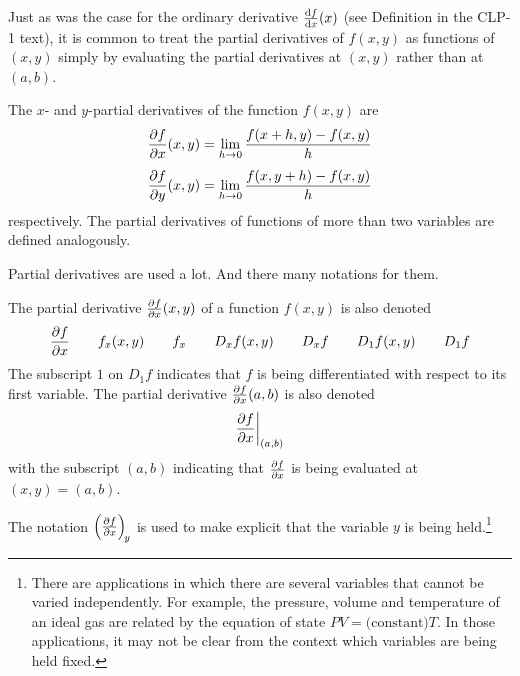 Just as was the case for the ordinary derivative $\diff{f}{x}(x)$
(see Definition  in the CLP-1 text),
it is common to treat the partial derivatives of $f(x,y)$ as functions
of $(x,y)$ simply by evaluating the partial derivatives at $(x,y)$ rather 
than at $(a,b)$.
\begin{defn}\label{def partials}
The $x$- and $y$-partial derivatives of the function $f(x,y)$
are
\begin{align*}
\pdiff{f}{x}(x,y)
  &= \lim_{h\rightarrow 0}\frac{f(x+h,y) - f(x,y)}{h} \\[0.05in]
\pdiff{f}{y}(x,y)
  &= \lim_{h\rightarrow 0}\frac{f(x,y+h) - f(x,y)}{h} 
\end{align*}
respectively. The partial derivatives of functions of more than two variables
are defined analogously.
\end{defn}

Partial derivatives are used a lot. And there many notations for them.
\begin{notn}\label{notn partial}
The partial derivative $\pdiff{f}{x}(x,y)$ of a function $f(x,y)$ is also denoted
\begin{equation*}
\pdiff{f}{x}\qquad
f_x(x,y)\qquad
f_x\qquad
D_xf(x,y)\qquad
D_xf\qquad
D_1 f(x,y)\qquad
D_1 f
\end{equation*}
The subscript $1$ on $D_1 f$ indicates that $f$ is being differentiated with respect to its first variable.
The partial derivative $\pdiff{f}{x}(a,b)$ is also denoted
\begin{equation*}
\pdiff{f}{x}\bigg|_{(a,b)}
\end{equation*}
with the subscript $(a,b)$ indicating that $\pdiff{f}{x}$ is being evaluated
at $(x,y)=(a,b)$.

\medskip
The notation ${\left(\pdiff{f}{x}\right)}_{\!y}$ is used to make explicit
that the variable $y$ is being held.\footnote{There are applications in which there are several variables that cannot be varied independently. For example,
the pressure, volume and temperature of an ideal gas are related by the equation of state $PV= \text{(constant)}T$. In those applications, it may not 
be clear from the context which variables are being held fixed.}


\end{notn}

